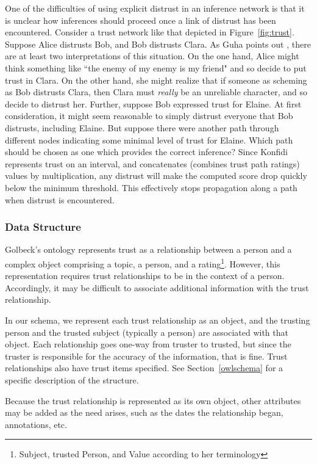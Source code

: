\documentclass{acm_proc_article-sp}
\begin{document}
One of the difficulties of using explicit distrust in an inference network is that it is unclear how inferences should proceed once a link of distrust has been encountered.  Consider a trust network like that depicted in Figure~\ref{fig:trust}.  Suppose Alice distrusts Bob, and Bob distrusts Clara.  As Guha points out \citep{guha04propagation}, there are at least two interpretations of this situation.  On the one hand, Alice might think something like ``the enemy of my enemy is my friend" and so decide to put trust in Clara.  On the other hand, she might realize that if someone as scheming as Bob distrusts Clara, then Clara must \textit{really} be an unreliable character, and so decide to distrust her.  Further, suppose Bob expressed trust for Elaine.  At first consideration, it might seem reasonable to simply distrust everyone that Bob distrusts, including Elaine.  But suppose there were another path through different nodes indicating some minimal level of trust for Elaine.  Which path should be chosen as one which provides the correct inference?  Since Konfidi represents trust on an interval, and concatenates (combines trust path ratings) values by multiplication, any distrust will make the computed score drop quickly below the minimum threshold.  This effectively stops propagation along a path when distrust is encountered.

\subsubsection{Data Structure}
\label{rating}
Golbeck's ontology represents trust as a relationship between a person and a complex object comprising a topic, a person, and a rating\footnote{Subject, trusted Person, and Value according to her terminology}.  However, this representation requires trust relationships to be in the context of a person.  Accordingly, it may be difficult to associate additional information with the trust relationship.  

In our schema, we represent each trust relationship as an object, and the trusting person and the trusted subject (typically a person) are associated with that object.  Each relationship goes one-way from truster to trusted, but since the truster is responsible for the accuracy of the information, that is fine.  Trust relationships also have trust items specified.  See Section~\ref{owlschema} for a specific description of the structure.

Because the trust relationship is represented as its own object, other attributes may be added as the need arises, such as the dates the relationship began, annotations, etc. 
\end{document}
